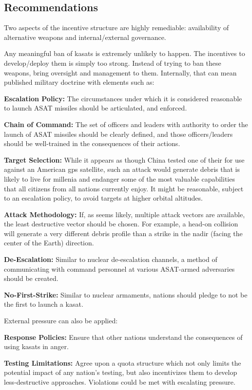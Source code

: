 \subsection{Recommendations}

Two aspects of the incentive structure are highly remediable:
availability of alternative weapons and internal/external governance.

Any meaningful ban of \acp{kasat} is extremely unlikely to happen.
The incentives to develop/deploy them is simply too strong.  Instead
of trying to ban these weapons, bring oversight and management to
them.  Internally, that can mean published military doctrine with
elements such as:

\textbf{Escalation Policy:} The circumstances under which it is
considered reasonable to launch ASAT missiles should be articulated,
and enforced.

\textbf{Chain of Command:} The set of officers and leaders with
authority to order the launch of ASAT missiles should be clearly
defined, and those officers/leaders should be well-trained in the
consequences of their actions.

\textbf{Target Selection:} While it appears as though China tested one
of their  for use against an American \ac{gps} satellite,
such an attack would generate debris that is likely to live for
millenia and endanger some of the most valuable capabilities that all
citizens from all nations currently enjoy.  It might be reasonable,
subject to an escalation policy, to avoid targets at higher orbital
altitudes.

\textbf{Attack Methodology:} If, as seems likely, multiple attack
vectors are available, the least destructive vector should be chosen.
For example, a head-on collision will generate a very different debris
profile than a strike in the nadir (facing the center of the Earth)
direction.

\textbf{De-Escalation:} Similar to nuclear de-escalation channels, a
method of communicating with command personnel at various ASAT-armed
adversaries should be created.

\textbf{No-First-Strike:} Similar to nuclear armaments, nations should
pledge to not be the first to launch a \ac{kasat}.

\noindent External pressure can also be applied:

\textbf{Response Policies:} Ensure that other nations understand the
consequences of using \acp{kasat} in anger.

\textbf{Testing Limitations:} Agree upon a quota structure which not
only limits the potential impact of any nation's testing, but also
incentivizes them to develop less-destructive approaches.  Violations
could be met with escalating pressure.

